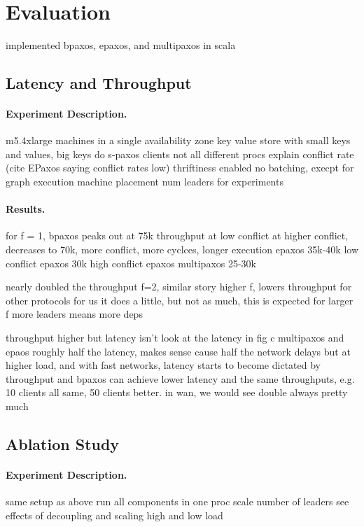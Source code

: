 \section{Evaluation}

implemented bpaxos, epaxos, and multipaxos in scala

\subsection{Latency and Throughput}
{}

\paragraph{Experiment Description.}
m5.4xlarge machines in a single availability zone
key value store with small keys and values, big keys do s-paxos
clients not all different procs
explain conflict rate (cite EPaxos saying conflict rates low)
thriftiness enabled
no batching, execpt for graph execution
machine placement
num leaders for experiments

\paragraph{Results.}
for f = 1,
bpaxos peaks out at 75k throughput at low conflict
at higher conflict, decreases to 70k, more conflict, more cyclces, longer execution
epaxos 35k-40k low conflict
epaxos 30k high conflict
epaxos multipaxos 25-30k

nearly doubled the throughput
f=2, similar story higher f, lowers throughput for other protocols
for us it does a little, but not as much, this is expected for larger f
more leaders means more deps

throughput higher but latency isn't
look at the latency in fig c
multipaxos and epaos roughly half the latency, makes sense cause half the network delays
but at higher load, and with fast networks, latency starts to become dictated by throughput and bpaxos can achieve lower latency and the same throughputs, e.g. 10 clients all same, 50 clients better. in wan, we would see double always pretty much

\subsection{Ablation Study}
{}

\paragraph{Experiment Description.}
same setup as above
run all components in one proc
scale number of leaders
see effects of decoupling and scaling
high and low load

